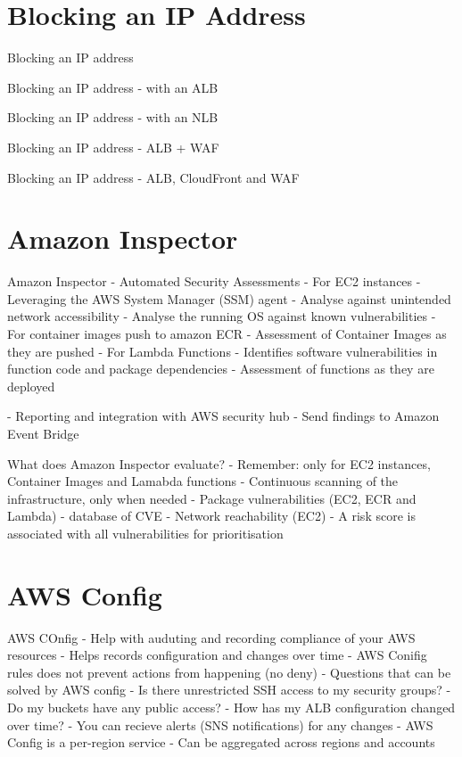 \documentclass[11pt]{book}
\begin{document}
    \section{Blocking an IP Address}

    Blocking an IP address

    Blocking an IP address - with an ALB

    Blocking an IP address - with an NLB

    Blocking an IP address - ALB + WAF

    Blocking an IP address - ALB, CloudFront and WAF

    \section{Amazon Inspector}
    Amazon Inspector
    - Automated Security Assessments
    - For EC2 instances
    - Leveraging the AWS System Manager (SSM) agent
    - Analyse against unintended network accessibility
    - Analyse the running OS against known vulnerabilities
    - For container images push to amazon ECR
    - Assessment of Container Images as they are pushed
    - For Lambda Functions
    - Identifies software vulnerabilities in function code and package dependencies
    - Assessment of functions as they are deployed

    - Reporting and integration with AWS security hub
    - Send findings to Amazon Event Bridge

    What does Amazon Inspector evaluate?
    - Remember: only for EC2 instances, Container Images and Lamabda functions
    - Continuous scanning of the infrastructure, only when needed
    - Package vulnerabilities (EC2, ECR and Lambda) - database of CVE
    - Network reachability (EC2)
    - A risk score is associated with all vulnerabilities for prioritisation

    \section{AWS Config}

    AWS COnfig
    - Help with auduting and recording compliance of your AWS resources
    - Helps records configuration and changes over time
    - AWS Conifig rules does not prevent actions from happening (no deny)
    - Questions that can be solved by AWS config
    - Is there unrestricted SSH access to my security groups?
    - Do my buckets have any public access?
    - How has my ALB configuration changed over time?
    - You can recieve alerts (SNS notifications) for any changes
    - AWS Config is a per-region service
    - Can be aggregated across regions and accounts
\end{document}
